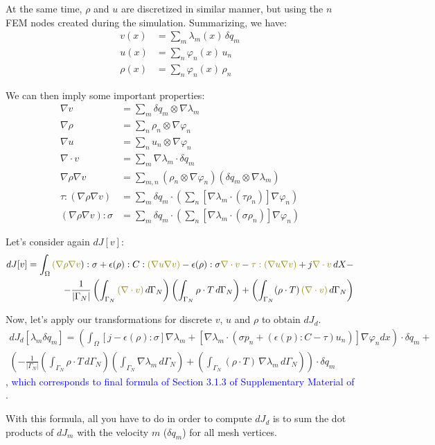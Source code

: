 \documentclass[11pt]{article}
\newcommand{\blue}{\textcolor{blue}}
\newcommand{\olive}{\textcolor{olive}}
\begin{document}
At the same time, $\rho$ and $u$ are discretized in similar manner, but using the $n$ FEM nodes created during the simulation. Summarizing, we have:
\begin{align*}
    v(x) &= \sum_m \lambda_m(x) \, \delta q_m\\
    u(x) &= \sum_n \varphi_n(x) \, u_n\\
    \rho(x) &= \sum_n \varphi_n(x) \, \rho_n
\end{align*}

We can then imply some important properties:
\begin{align*}
    \nabla v &= \sum_m   \delta q_m \otimes \nabla \lambda_m\\
    \nabla \rho &= \sum_n   \rho_n \otimes \nabla \varphi_n\\
    \nabla u &= \sum_n   u_n \otimes \nabla \varphi_n\\
    \nabla \cdot v &= \sum_m   \nabla \lambda_m \cdot \delta q_m\\    
    \nabla \rho \nabla v &= \sum_{m,n} (\rho_n \otimes \nabla \varphi_n)(\delta q_m \otimes \nabla \lambda_m)\\
    \tau:(\nabla \rho \nabla v) &= \sum_m \delta q_m \cdot (\sum_n \left[ \nabla \lambda_m \cdot (\tau \rho_n) \right] \nabla \varphi_n)\\
    (\nabla \rho \nabla v):\sigma &= \sum_m \delta q_m \cdot (\sum_n \left[ \nabla \lambda_m \cdot (\sigma \rho_n) \right] \nabla \varphi_n)
\end{align*}

Let's consider again $dJ[v]$:
\begin{align*}
  dJ[v] = \int_{\Omega} \olive{(\nabla \rho \nabla v}):\sigma + \epsilon(\rho):C:\olive{(\nabla u \nabla v)} - \epsilon(\rho): \sigma \olive{\nabla \cdot v}  - \olive{\tau : (\nabla u \nabla v)} + j \olive{\nabla \cdot v} \, dX - \\ - \frac{1}{|\Gamma_N|} \left( \int_{\Gamma_{N}} \olive{(\nabla \cdot v)} \, d\Gamma_{N} \right)  \left(\int_{\Gamma_N} \rho \cdot T\, d\Gamma_N\right) + \left(\int_{\Gamma_{N}} (\rho \cdot T) \, \olive{(\nabla \cdot v)}\, d\Gamma_{N}\right)
\end{align*}

Now, let's apply our transformations for discrete $v$, $u$ and $\rho$ to obtain $dJ_d$.
\begin{multline}
  \boxed{dJ_d[\lambda_m \delta q_m] = \left( \int_\Omega \left[ j - \epsilon(\rho):\sigma \right] \nabla \lambda_m + \left[ \nabla \lambda_m \cdot (\sigma p_n + (\epsilon(p):C-\tau)u_n) \right] \nabla \varphi_n dx\right)\cdot \delta q_m +} \\ \boxed{\left( - \frac{1}{|\Gamma_N|}   \left(\int_{\Gamma_N} \rho \cdot T\, d\Gamma_N\right) \left( \int_{\Gamma_{N}} \nabla \lambda_m \, d\Gamma_{N} \right) + \left(\int_{\Gamma_{N}} (\rho \cdot T) \, \nabla \lambda_m\, d\Gamma_{N}\right) \right) \cdot \delta q_m}
\end{multline}
, \blue{which corresponds to final formula of Section 3.1.3 of Supplementary Material of \cite{panetta2017}}.

With this formula, all you have to do in order to compute $dJ_d$ is to sum the dot products of $dJ_m$ with the velocity $m$ ($\delta q_m$) for all mesh vertices.



 
\end{document}
